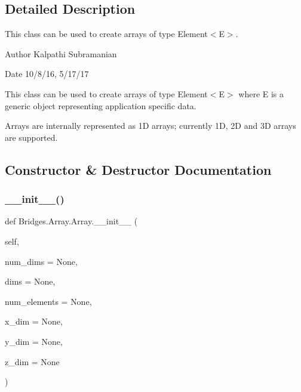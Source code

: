 \subsection{Detailed Description}
This class can be used to create arrays of type Element$<$\+E$>$. 

\begin{DoxyAuthor}{Author}
Kalpathi Subramanian
\end{DoxyAuthor}
\begin{DoxyDate}{Date}
10/8/16, 5/17/17
\end{DoxyDate}
This class can be used to create arrays of type Element$<$\+E$>$ where E is a generic object representing application specific data.

Arrays are internally represented as 1D arrays; currently 1D, 2D and 3D arrays are supported. 

\subsection{Constructor \& Destructor Documentation}
\mbox{\label{class_bridges_1_1_array_1_1_array_ad8e23399ea1e3f5bf4cbefdb5d9371be}} 
\subsubsection{\texorpdfstring{\+\_\+\+\_\+init\+\_\+\+\_\+()}{\_\_init\_\_()}}
{\footnotesize\ttfamily def Bridges.\+Array.\+Array.\+\_\+\+\_\+init\+\_\+\+\_\+ (\begin{DoxyParamCaption}\item[{}]{self,  }\item[{}]{num\+\_\+dims = {\ttfamily None},  }\item[{}]{dims = {\ttfamily None},  }\item[{}]{num\+\_\+elements = {\ttfamily None},  }\item[{}]{x\+\_\+dim = {\ttfamily None},  }\item[{}]{y\+\_\+dim = {\ttfamily None},  }\item[{}]{z\+\_\+dim = {\ttfamily None} }\end{DoxyParamCaption})}



